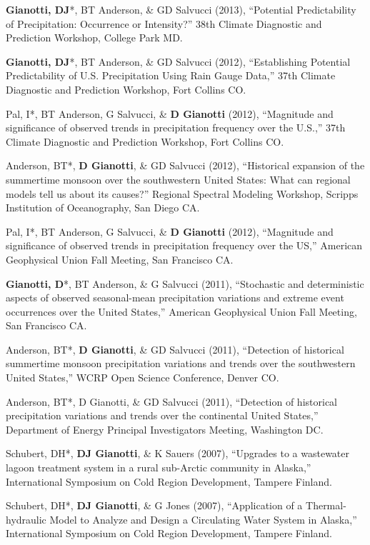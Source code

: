 \documentclass[10pt, a4paper]{article}
\newcommand{\lbr}{\vspace*{4pt}}
\newcommand{\years}[1]{\marginnote{\scriptsize #1}}
\begin{document}
\years{2013}\textbf{Gianotti, DJ}*, BT Anderson, \& GD Salvucci  (2013), ``Potential Predictability of Precipitation: Occurrence or Intensity?'' 38th Climate Diagnostic and Prediction Workshop, College Park MD.\lbr

\years{2012}\textbf{Gianotti, DJ}*, BT Anderson, \& GD Salvucci (2012), ``Establishing Potential Predictability of U.S. Precipitation Using Rain Gauge Data,'' 37th Climate Diagnostic and Prediction Workshop, Fort Collins CO.\lbr

\years{2012}Pal, I*, BT Anderson, G Salvucci, \& \textbf{D Gianotti}  (2012), ``Magnitude and significance of observed trends in precipitation frequency over the U.S.,'' 37th Climate Diagnostic and Prediction Workshop, Fort Collins CO.\lbr

\years{2012}Anderson, BT*, \textbf{D Gianotti}, \& GD Salvucci (2012), ``Historical expansion of the summertime monsoon over the southwestern United States: What can regional models tell us about its causes?'' Regional Spectral Modeling Workshop, Scripps Institution of Oceanography, San Diego CA.\lbr

\years{2012}Pal, I*, BT Anderson, G Salvucci, \& \textbf{D Gianotti} (2012), ``Magnitude and significance of observed trends in precipitation frequency over the US,'' American Geophysical Union Fall Meeting, San Francisco CA.\lbr

\years{2011}\textbf{Gianotti, D}*, BT Anderson, \& G Salvucci (2011), ``Stochastic and deterministic aspects of observed seasonal-mean precipitation variations and extreme event occurrences over the United States,'' American Geophysical Union Fall Meeting, San Francisco CA.\lbr

\years{2011} Anderson, BT*, \textbf{D Gianotti}, \& GD Salvucci (2011), ``Detection of historical summertime monsoon precipitation variations and trends over the southwestern United States,'' WCRP Open Science Conference, Denver CO.\lbr

\years{2011} Anderson, BT*, D Gianotti, \& GD Salvucci (2011), ``Detection of historical precipitation variations and trends over the continental United States,'' Department of Energy Principal Investigators Meeting, Washington DC.\lbr

\years{2007}Schubert, DH*, \textbf{DJ Gianotti}, \& K Sauers (2007), ``Upgrades to a  wastewater lagoon treatment system in a rural sub-Arctic community in Alaska,'' International Symposium on Cold Region Development, Tampere Finland.\lbr

\years{2007}Schubert, DH*, \textbf{DJ Gianotti}, \& G Jones (2007), ``Application of a Thermal-hydraulic Model to Analyze and Design a Circulating Water System in Alaska,'' International Symposium on Cold Region Development, Tampere Finland.\lbr
\end{document}
